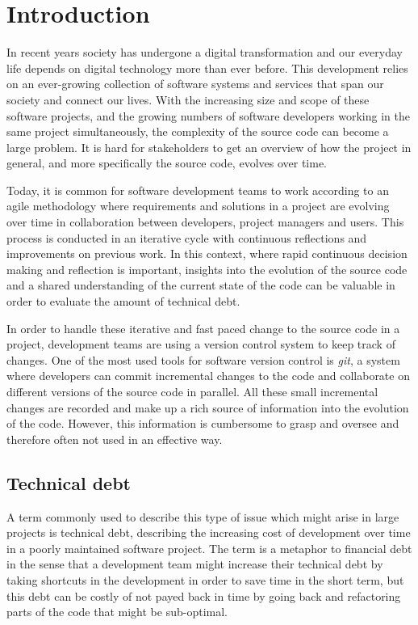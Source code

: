 

\section{Introduction}
In recent years society has undergone a digital transformation and our everyday life depends on digital technology more than ever before. This development relies on an ever-growing collection of software systems and services that span our society and connect our lives. With the increasing size and scope of these software projects, and the growing numbers of software developers working in the same project simultaneously, the complexity of the source code can become a large problem. It is hard for stakeholders to get an overview of how the project in general, and more specifically the source code, evolves over time.

Today, it is common for software development teams to work according to an agile methodology where requirements and solutions in a project are evolving over time in collaboration between developers, project managers and users. This process is conducted in an iterative cycle with continuous reflections and improvements on previous work. \cite{hazzan_agile_2014} In this context, where rapid continuous decision making and reflection is important, insights into the evolution of the source code and a shared understanding of the current state of the code can be valuable in order to evaluate the amount of technical debt.

In order to handle these iterative and fast paced change to the source code in a project, development teams are using a version control system to keep track of changes. One of the most used tools for software version control is \textit{git}, a system where developers can commit incremental changes to the code and collaborate on different versions of the source code in parallel. All these small incremental changes are recorded and make up a rich source of information into the evolution of the code. However, this information is cumbersome to grasp and oversee and therefore often not used in an effective way.

\subsection{Technical debt}
A term commonly used to describe this type of issue which might arise in large projects is technical debt, describing the increasing cost of development over time in a poorly maintained software project. The term is a metaphor to financial debt in the sense that a development team might increase their technical debt by taking shortcuts in the development in order to save time in the short term, but this debt can be costly of not payed back in time by going back and refactoring parts of the code that might be sub-optimal.


